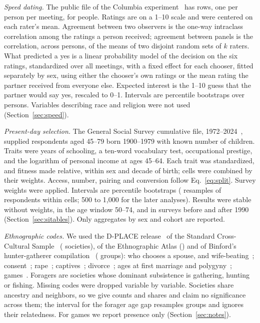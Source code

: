 \emph{Speed dating.} The public file of the Columbia experiment~\cite{fisman2006} has \SdRows{} rows, one per person per
meeting, for \SdN{} people. Ratings are on a 1--10 scale and were
centered on each rater's mean. Agreement between two observers is the one-way intraclass correlation among the ratings a
person received; agreement between panels is the correlation, across persons, of the means of two disjoint random sets of
$k$ raters. What predicted a yes is a linear probability model of the decision on the six ratings,
standardized over all meetings, with a fixed effect for each chooser, fitted separately by sex, using either the chooser's
own ratings or the mean rating the partner received from everyone else. Expected interest is the 1--10 guess that the
partner would say yes, rescaled to 0--1. Intervals are percentile bootstraps over persons. Variables describing race and
religion were not used (Section~\ref{sec:speed}).

\emph{Present-day selection.} The General Social Survey cumulative file, 1972--2024~\cite{gss2024}, supplied \GssN{} respondents
aged 45--79 born 1900--1979 with known number of children. Traits were years of schooling, a ten-word vocabulary test,
occupational prestige, and the logarithm of personal income at ages 45--64. Each trait was standardized, and fitness made
relative, within sex and decade of birth; cells were combined by their weights. Access, number, pairing and conversion
follow Eq.~\eqref{eq:split}. Survey weights were applied. Intervals are percentile bootstraps (\GssBoot{} resamples of
respondents within cells; 500 to 1,000 for the later analyses). Results were stable without weights, in the age window
50--74, and in surveys before and after 1990 (Section~\ref{sec:sitables}). Only aggregates by sex and cohort are reported.

\emph{Ethnographic codes.} We used the D-PLACE release~\cite{kirby2016} of the Standard Cross-Cultural
Sample~\cite{murdock1969} (\CcSccsN{} societies), of the Ethnographic Atlas (\CcEaN) and of Binford's hunter-gatherer
compilation~\cite{binford2001} (\CcBinN{} groups): who chooses a spouse, and wife-beating~\cite{broude1983};
consent~\cite{frayser1985}; rape~\cite{broude1976,sanday1981book}; captives~\cite{white1988}; divorce~\cite{whyte1978}; ages at
first marriage and polygyny~\cite{binford2001}; games~\cite{roberts1959}. Foragers are societies whose dominant subsistence is
gathering, hunting or fishing. Missing codes were dropped variable by variable. Societies share ancestry and neighbors, so
we give counts and shares and claim no significance across them; the interval for the forager age gap resamples groups and
ignores their relatedness. For games we report presence only (Section~\ref{sec:notes}).

